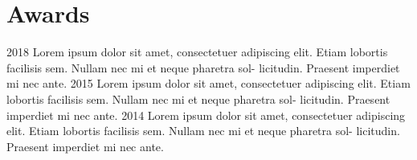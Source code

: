 \documentclass[11pt,a4paper]{smooth-banner-cv}
\begin{document}
\section{Awards}

\begin{simplelist}
  \simplelistitem
      {2018}
      {Lorem ipsum dolor sit amet, consectetuer adipiscing elit. Etiam
        lobortis facilisis sem. Nullam nec mi et neque pharetra sol-
        licitudin. Praesent imperdiet mi nec ante.}
  \simplelistitem
      {2015}
      {Lorem ipsum dolor sit amet, consectetuer adipiscing elit. Etiam
        lobortis facilisis sem. Nullam nec mi et neque pharetra sol-
        licitudin. Praesent imperdiet mi nec ante.}
  \simplelistitem
      {2014}
      {Lorem ipsum dolor sit amet, consectetuer adipiscing elit. Etiam
        lobortis facilisis sem. Nullam nec mi et neque pharetra sol-
        licitudin. Praesent imperdiet mi nec ante.}
\end{simplelist}
\end{document}
